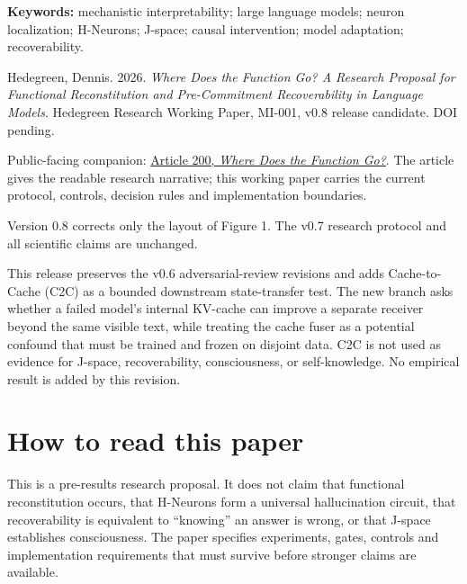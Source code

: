 \documentclass[11pt,a4paper]{article}
\begin{document}
\vspace{3mm}
\textbf{Keywords:} mechanistic interpretability; large language models; neuron localization; H-Neurons; J-space; causal intervention; model adaptation; recoverability.

\begin{tcolorbox}[camelotbox,title={Preferred citation}]
Hedegreen, Dennis. 2026. \emph{Where Does the Function Go? A Research Proposal for Functional Reconstitution and Pre-Commitment Recoverability in Language Models}. Hedegreen Research Working Paper, MI-001, v0.8 release candidate. DOI pending.
\end{tcolorbox}

\begin{tcolorbox}[camelotbox,title={Companion article}]
Public-facing companion: \href{https://hedegreenresearch.com/articles/where-does-the-function-go/}{Article 200, \emph{Where Does the Function Go?}}. The article gives the readable research narrative; this working paper carries the current protocol, controls, decision rules and implementation boundaries.
\end{tcolorbox}

\begin{tcolorbox}[camelotbox,title={Protocol revision note -- v0.8}]
Version 0.8 corrects only the layout of Figure 1. The v0.7 research protocol and all scientific claims are unchanged.


This release preserves the v0.6 adversarial-review revisions and adds Cache-to-Cache (C2C) as a bounded downstream state-transfer test. The new branch asks whether a failed model's internal KV-cache can improve a separate receiver beyond the same visible text, while treating the cache fuser as a potential confound that must be trained and frozen on disjoint data. C2C is not used as evidence for J-space, recoverability, consciousness, or self-knowledge. No empirical result is added by this revision.
\end{tcolorbox}

\clearpage
\section*{How to read this paper}
This is a pre-results research proposal. It does not claim that functional reconstitution occurs, that H-Neurons form a universal hallucination circuit, that recoverability is equivalent to ``knowing'' an answer is wrong, or that J-space establishes consciousness. The paper specifies experiments, gates, controls and implementation requirements that must survive before stronger claims are available.
\end{document}
